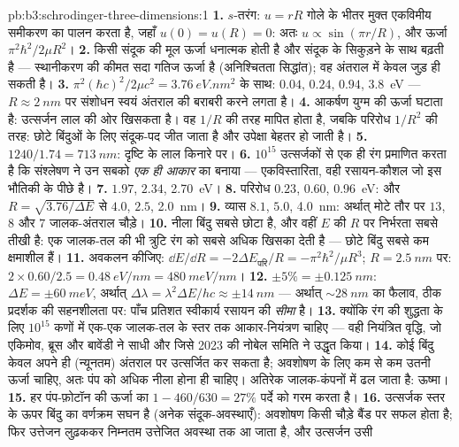 \begin{solution}{pb:b3:schrodinger-three-dimensions:1}
\textbf{1.} $s$-तरंग: $u = rR$ गोले के भीतर मुक्त एकविमीय समीकरण का
पालन करता है, जहाँ $u(0) = u(R) = 0$: अतः $u \propto \sin(\pi r/R)$,
और ऊर्जा $\pi^2\hbar^2/2\mu R^2$।
\textbf{2.} किसी संदूक की मूल ऊर्जा धनात्मक होती है और संदूक के
सिकुड़ने के साथ बढ़ती है --- स्थानीकरण की कीमत सदा गतिज ऊर्जा है
(अनिश्चितता सिद्धांत); वह अंतराल में केवल जुड़ ही सकती है।
\textbf{3.} $\pi^2(\hbar c)^2/2\mu c^2 = \qty{3.76}{eV.nm^2}$ के साथ:
$0.04$, $0.24$, $0.94$, \qty{3.8}{eV} --- $R \approx \qty{2}{nm}$ पर
संशोधन स्वयं अंतराल की बराबरी करने लगता है।
\textbf{4.} आकर्षण युग्म की ऊर्जा घटाता है: उत्सर्जन लाल की ओर
खिसकता है। वह $1/R$ की तरह मापित होता है, जबकि परिरोध $1/R^2$ की तरह:
छोटे बिंदुओं के लिए संदूक-पद जीत जाता है और उपेक्षा बेहतर हो जाती है।
\textbf{5.} $1240/1.74 = \qty{713}{nm}$: दृष्टि के लाल किनारे पर।
\textbf{6.} $10^{15}$ उत्सर्जकों से एक ही रंग प्रमाणित करता है कि
संश्लेषण ने उन सबको \emph{एक ही आकार} का बनाया --- एकविस्तारिता, वही
रसायन-कौशल जो इस भौतिकी के पीछे है।
\textbf{7.} $1.97$, $2.34$, \qty{2.70}{eV}।
\textbf{8.} परिरोध $0.23$, $0.60$, \qty{0.96}{eV}: और $R =
\sqrt{3.76/\Delta E}$ से $4.0$, $2.5$, \qty{2.0}{nm}।
\textbf{9.} व्यास $8.1$, $5.0$, \qty{4.0}{nm}: अर्थात् मोटे तौर पर
$13$, $8$ और $7$ जालक-अंतराल चौड़े।
\textbf{10.} नीला बिंदु सबसे छोटा है, और वहीं $E$ की $R$ पर निर्भरता
सबसे तीखी है: एक जालक-तल की भी त्रुटि रंग को सबसे अधिक खिसका देती है ---
छोटे बिंदु सबसे कम क्षमाशील हैं।
\textbf{11.} अवकलन कीजिए: $\dd E/\dd R = -2\Delta E_{\text{परि}}/R
= -\pi^2\hbar^2/\mu R^3$; $R = \qty{2.5}{nm}$ पर: $2 \times 0.60/2.5
= \qty{0.48}{eV/nm} = \qty{480}{meV/nm}$।
\textbf{12.} $\pm 5\% = \pm\qty{0.125}{nm}$: $\Delta E = \pm
\qty{60}{meV}$, अर्थात् $\Delta\lambda = \lambda^2\Delta E/hc \approx
\pm\qty{14}{nm}$ --- अर्थात् $\sim\qty{28}{nm}$ का फैलाव, ठीक
प्रदर्शक की सहनशीलता पर: पाँच प्रतिशत स्वीकार्य रसायन की
\emph{सीमा} है।
\textbf{13.} क्योंकि रंग की शुद्धता के लिए $10^{15}$ कणों में
एक-एक जालक-तल के स्तर तक आकार-नियंत्रण चाहिए --- वही नियंत्रित
वृद्धि, जो एकिमोव, ब्रूस और बावेंडी ने साधी और जिसे
2023 की नोबेल समिति ने उद्धृत किया।
\textbf{14.} कोई बिंदु केवल अपने ही (न्यूनतम) अंतराल पर उत्सर्जित कर
सकता है; अवशोषण के लिए कम से कम उतनी ऊर्जा चाहिए, अतः पंप को अधिक नीला
होना ही चाहिए। अतिरेक जालक-कंपनों में ढल जाता है: ऊष्मा।
\textbf{15.} हर पंप-फ़ोटॉन की ऊर्जा का $1 - 460/630 = 27\%$ पर्दे को
गरम करता है।
\textbf{16.} उत्सर्जक स्तर के ऊपर बिंदु का वर्णक्रम सघन है
(अनेक संदूक-अवस्थाएँ): अवशोषण किसी चौड़े बैंड पर सफल होता है; फिर
उत्तेजन लुढ़ककर निम्नतम उत्तेजित अवस्था तक आ जाता है, और उत्सर्जन उसी

\end{solution}
